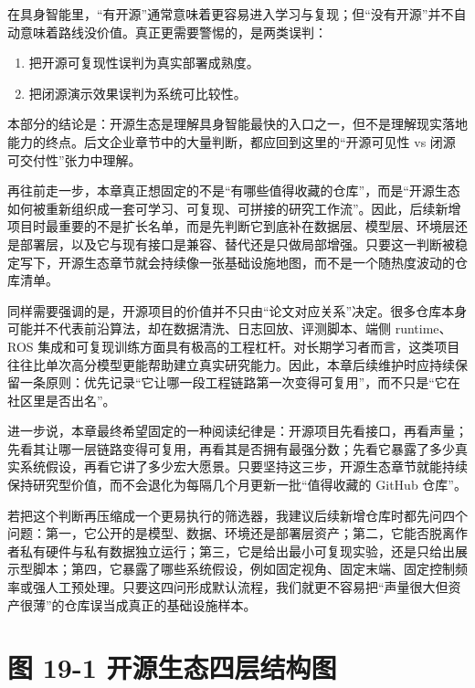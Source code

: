 在具身智能里，“有开源”通常意味着更容易进入学习与复现；但“没有开源”并不自动意味着路线没价值。真正更需要警惕的，是两类误判：

\begin{enumerate}
\item 把开源可复现性误判为真实部署成熟度。
\item 把闭源演示效果误判为系统可比较性。
\end{enumerate}

本部分的结论是：开源生态是理解具身智能最快的入口之一，但不是理解现实落地能力的终点。后文企业章节中的大量判断，都应回到这里的“开源可见性 vs 闭源可交付性”张力中理解。

再往前走一步，本章真正想固定的不是“有哪些值得收藏的仓库”，而是“开源生态如何被重新组织成一套可学习、可复现、可拼接的研究工作流”。因此，后续新增项目时最重要的不是扩长名单，而是先判断它到底补在数据层、模型层、环境层还是部署层，以及它与现有接口是兼容、替代还是只做局部增强。只要这一判断被稳定写下，开源生态章节就会持续像一张基础设施地图，而不是一个随热度波动的仓库清单。

同样需要强调的是，开源项目的价值并不只由“论文对应关系”决定。很多仓库本身可能并不代表前沿算法，却在数据清洗、日志回放、评测脚本、端侧 runtime、ROS 集成和可复现训练方面具有极高的工程杠杆。对长期学习者而言，这类项目往往比单次高分模型更能帮助建立真实研究能力。因此，本章后续维护时应持续保留一条原则：优先记录“它让哪一段工程链路第一次变得可复用”，而不只是“它在社区里是否出名”。

进一步说，本章最终希望固定的一种阅读纪律是：开源项目先看接口，再看声量；先看其让哪一层链路变得可复用，再看其是否拥有最强分数；先看它暴露了多少真实系统假设，再看它讲了多少宏大愿景。只要坚持这三步，开源生态章节就能持续保持研究型价值，而不会退化为每隔几个月更新一批“值得收藏的 GitHub 仓库”。

若把这个判断再压缩成一个更易执行的筛选器，我建议后续新增仓库时都先问四个问题：第一，它公开的是模型、数据、环境还是部署层资产；第二，它能否脱离作者私有硬件与私有数据独立运行；第三，它是给出最小可复现实验，还是只给出展示型脚本；第四，它暴露了哪些系统假设，例如固定视角、固定末端、固定控制频率或强人工预处理。只要这四问形成默认流程，我们就更不容易把“声量很大但资产很薄”的仓库误当成真正的基础设施样本。

\section*{图 19-1 开源生态四层结构图}

